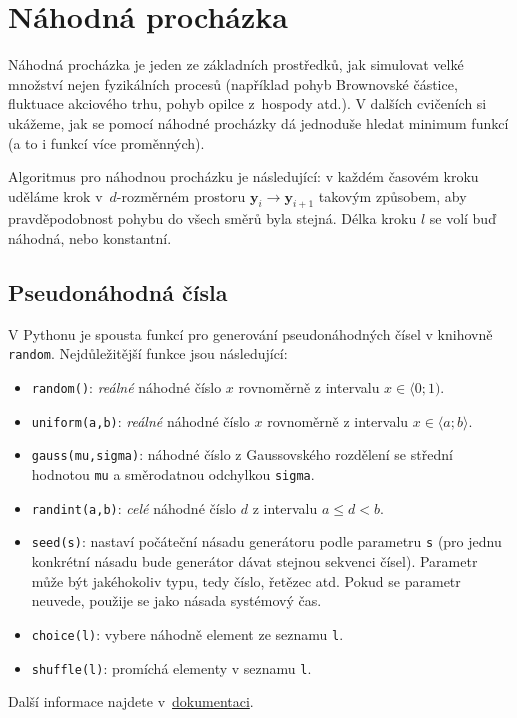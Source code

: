 \documentclass[a4paper,11pt,twoside]{article}
\def\vector#1{\boldsymbol{#1}}								%
\def\code#1{\textnormal{\texttt{#1}}}
\begin{document}
\section{Náhodná procházka}
    Náhodná procházka je jeden ze základních prostředků, jak simulovat velké množství nejen fyzikálních procesů (například pohyb Brownovské částice, fluktuace akciového trhu, pohyb opilce z~hospody atd.).
    V dalších cvičeních si ukážeme, jak se pomocí náhodné procházky dá jednoduše hledat minimum funkcí (a to i funkcí více proměnných). 

    Algoritmus pro náhodnou procházku je následující: v každém časovém kroku uděláme krok v~$d$-rozměrném prostoru $\vector{y}_{i}\rightarrow\vector{y}_{i+1}$ takovým způsobem, aby pravděpodobnost pohybu do všech směrů byla stejná.
    Délka kroku $l$ se volí buď náhodná, nebo konstantní.

    \subsection{Pseudonáhodná čísla}
        V Pythonu je spousta funkcí pro generování pseudonáhodných čísel v knihovně \code{random}.
        Nej\-dů\-le\-ži\-těj\-ší funkce jsou následující:
        \begin{itemize}
        \item \code{random()}: \emph{reálné} náhodné číslo $x$ rovnoměrně z intervalu $x\in\langle 0;1)$.
        \item \code{uniform(a,b)}: \emph{reálné} náhodné číslo $x$ rovnoměrně z intervalu $x\in\langle a;b\rangle$.
        \item \code{gauss(mu,sigma)}: náhodné číslo z Gaussovského rozdělení se střední hodnotou \code{mu} a smě\-ro\-dat\-nou odchylkou \code{sigma}. 
        \item \code{randint(a,b)}: \emph{celé} náhodné číslo $d$ z intervalu $a\leq d<b$.
        \item \code{seed(s)}: nastaví počáteční násadu generátoru podle parametru \code{s} (pro jednu konkrétní násadu bude generátor dávat stejnou sekvenci čísel). 
        Parametr může být jakéhokoliv typu, tedy číslo, řetězec atd. 
        Pokud se parametr neuvede, použije se jako násada systémový čas.
        \item \code{choice(l)}: vybere náhodně element ze seznamu \code{l}.
        \item \code{shuffle(l)}: promíchá elementy v seznamu \code{l}.
        \end{itemize}
        Další informace najdete v~\href{https://docs.python.org/3/library/random.html}{dokumentaci}.
\end{document}
